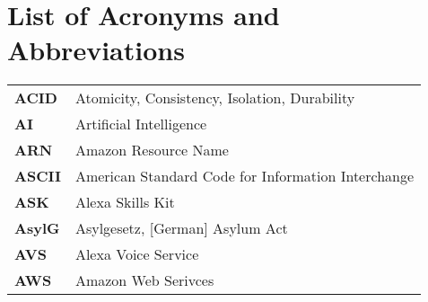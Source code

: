 \section*{List of Acronyms and Abbreviations }
\begin{flushleft}
\begin{tabular}{ll}



\textbf{ACID}	&	Atomicity, Consistency, Isolation, Durability\\ %
\textbf{AI}		&	Artificial Intelligence\\
\textbf{ARN}	&	Amazon Resource Name\\
\textbf{ASCII}&	American Standard Code for Information Interchange\\%
\textbf{ASK}	&	Alexa Skills Kit\\
\textbf{AsylG}	&	Asylgesetz, [German] Asylum Act\\
\textbf{AVS}	&	Alexa Voice Service\\
\textbf{AWS}	&	Amazon Web Serivces\\


\end{tabular}
\end{flushleft}
